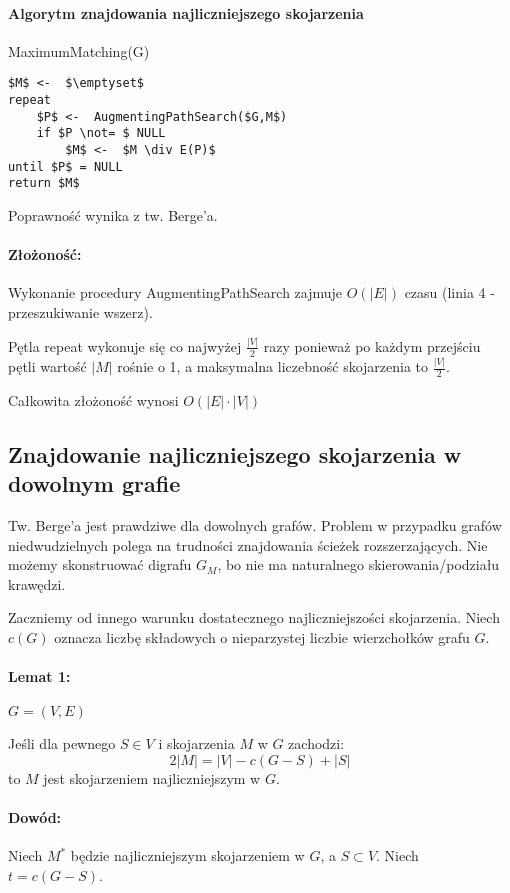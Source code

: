 \paragraph{Algorytm znajdowania najliczniejszego skojarzenia}
MaximumMatching(G)
\begin{lstlisting}
$M$ <-  $\emptyset$
repeat
	$P$ <-  AugmentingPathSearch($G,M$)
	if $P \not= $ NULL
		$M$ <-  $M \div E(P)$
until $P$ = NULL
return $M$
\end{lstlisting}
Poprawność wynika z tw. Berge'a.

\paragraph{Złożoność:}
Wykonanie procedury AugmentingPathSearch zajmuje $O(|E|)$ czasu (linia 4 - przeszukiwanie wszerz).

Pętla repeat wykonuje się co najwyżej $\frac{|V|}{2}$ razy ponieważ po każdym przejściu pętli wartość $|M|$ rośnie o 1, a maksymalna liczebność skojarzenia to $\frac{|V|}{2}$. 

Całkowita złożoność wynosi $O(|E| \cdot |V|)$

\subsection{Znajdowanie najliczniejszego skojarzenia w dowolnym grafie}

Tw. Berge'a jest prawdziwe dla dowolnych grafów. Problem w przypadku grafów niedwudzielnych polega na trudności znajdowania ścieżek rozszerzających. Nie możemy skonstruować digrafu $G_M$, bo nie ma naturalnego skierowania/podziału krawędzi.

Zaczniemy od innego warunku dostatecznego najliczniejszości skojarzenia. Niech $c(G)$ oznacza liczbę składowych o nieparzystej liczbie wierzchołków grafu $G$.

\paragraph{Lemat 1:} $G=(V,E)$

Jeśli dla pewnego $S \in V$ i skojarzenia $M$ w $G$ zachodzi:
$$ 2 |M| = |V|  - c(G-S) + |S|$$ 
to $M$ jest skojarzeniem najliczniejszym w $G$.

\paragraph{Dowód:}

Niech $M^*$ będzie najliczniejszym skojarzeniem w $G$, a $S \subset V$. Niech $t = c(G-S)$.

